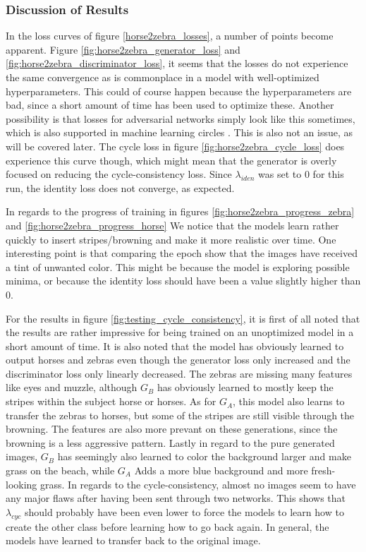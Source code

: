 \documentclass[12pt, fleqn, titlepage]{article}
\newcommand{\1}[1]{\mathds{1}\left[#1\right]}
\begin{document}
\subsubsection{Discussion of Results}
In the loss curves of figure \ref{horse2zebra_losses}, a number of points become apparent. Figure \ref{fig:horse2zebra_generator_loss} and \ref{fig:horse2zebra_discriminator_loss}, it seems that the losses do not experience the same convergence as is commonplace in a model with well-optimized hyperparameters. This could of course happen because the hyperparameters are bad, since a short amount of time has been used to optimize these. Another possibility is that losses for adversarial networks simply look like this sometimes, which is also supported in  machine learning circles \cite{mode_collapse_MLM}. This is also not an issue, as will be covered later. The cycle loss in figure \ref{fig:horse2zebra_cycle_loss} does experience this curve though, which might mean that the generator is overly focused on reducing the cycle-consistency loss. Since $\lambda_{iden}$ was set to $ 0 $ for this run, the identity loss does not converge, as expected.

In regards to the progress of training in figures \ref{fig:horse2zebra_progress_zebra} and \ref{fig:horse2zebra_progress_horse} We notice that the models learn rather quickly to insert stripes/browning and make it more realistic over time. One interesting point is that comparing the epoch show that the images have received a tint of unwanted color. This might be because the model is exploring possible minima, or because the identity loss should have been a value slightly higher than $0$.

For the results in figure \ref{fig:testing_cycle_consistency}, it is first of all noted that the results are rather impressive for being trained on an unoptimized model in a short amount of time. It is also noted that the model has obviously learned to output horses and zebras even though the generator loss only increased and the discriminator loss only linearly decreased. The zebras are missing many features like eyes and muzzle, although $G_B$ has obviously learned to mostly keep the stripes within the subject horse or horses. As for $G_A$, this model also learns to transfer the zebras to horses, but some of the stripes are still visible through the browning. The features are also more prevant on these generations, since the browning is a less aggressive pattern. Lastly in regard to the pure generated images, $G_B$ has seemingly also learned to color the background larger and make grass on the beach, while $G_A$ Adds a more blue background and more fresh-looking grass. In regards to the cycle-consistency, almost no images seem to have any major flaws after having been sent through two networks. This shows that $\lambda_{cyc}$ should probably have been even lower to force the models to learn how to create the other class before learning how to go back again. In general, the models have learned to transfer back to the original image.
\end{document}

